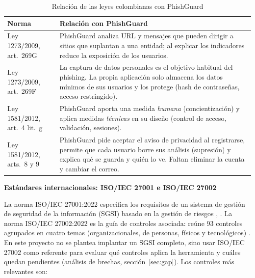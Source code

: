\documentclass[journal,onecolumn,12pt,draftclsnofoot]{IEEEtran}
\newcommand{\apartado}[1]{\par\medskip\noindent\textbf{#1}\par\smallskip}
\begin{document}
\begin{table}[htbp]
\centering
\caption{Relación de las leyes colombianas con PhishGuard}\label{tab:leyes}
\small
\setlength{\tabcolsep}{4pt}
\begin{tabular}{|p{}|p{}|}
\hline
\textbf{Norma} & \textbf{Relación con PhishGuard} \\ \hline
Ley 1273/2009, art.\ 269G & PhishGuard analiza URL y mensajes que pueden dirigir a sitios que suplantan a una entidad; al explicar los indicadores reduce la exposición de los usuarios. \\ \hline
Ley 1273/2009, art.\ 269F & La captura de datos personales es el objetivo habitual del phishing. La propia aplicación solo almacena los datos mínimos de sus usuarios y los protege (hash de contraseñas, acceso restringido). \\ \hline
Ley 1581/2012, art.\ 4 lit.\ g & PhishGuard aporta una medida \emph{humana} (concientización) y aplica medidas \emph{técnicas} en su diseño (control de acceso, validación, sesiones). \\ \hline
Ley 1581/2012, arts.\ 8 y 9 & PhishGuard pide aceptar el aviso de privacidad al registrarse, permite que cada usuario borre sus análisis (supresión) y explica qué se guarda y quién lo ve. Faltan eliminar la cuenta y cambiar el correo. \\ \hline
\end{tabular}
\end{table}

\apartado{Estándares internacionales: ISO/IEC 27001 e ISO/IEC 27002}

La norma ISO/IEC 27001:2022 especifica los requisitos de un sistema de gestión de seguridad de la información (SGSI) basado en la gestión de riesgos \cite{iso27001}, \cite{icontec}. La norma ISO/IEC 27002:2022 es la guía de controles asociada: reúne 93 controles agrupados en cuatro temas (organizacionales, de personas, físicos y tecnológicos) \cite{iso27002}. En este proyecto no se plantea implantar un SGSI completo, sino usar ISO/IEC 27002 como referente para evaluar qué controles aplica la herramienta y cuáles quedan pendientes (análisis de brechas, sección~\ref{sec:gap}). Los controles más relevantes son:
\end{document}
